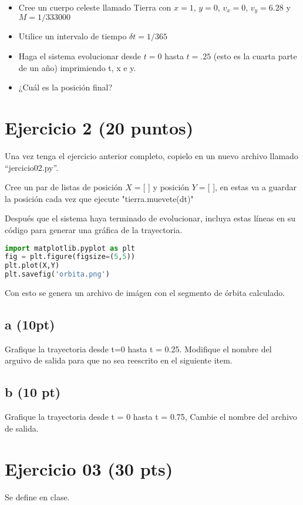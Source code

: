\documentclass{article}
\begin{document}
\begin{itemize}
    \item Cree un cuerpo celeste llamado Tierra con $x=1$, $y=0$, $v_x=0$, $v_y=6.28$ y 
$M = 1 / 333000$
    \item Utilice un intervalo de tiempo $\delta t  = 1 / 365$
    \item Haga el sistema evolucionar desde $t=0$ hasta $t=.25$ (esto es la cuarta 
    parte de un año) imprimiendo t, x e y.
    \item ¿Cuál es la posición final?
\end{itemize}

\section*{Ejercicio 2 (20 puntos)}

Una vez tenga el ejercicio anterior completo, copielo en un nuevo archivo llamado
``jercicio02.py''. 

Cree un par de listas de posición $X=$[ ] y posición $Y=$[ ], en estas 
va a guardar la posición cada vez que ejecute "tierra.muevete(dt)"

Después que el sistema haya terminado de evolucionar, incluya estas líneas en su 
código para generar una gráfica de la trayectoria.

\begin{lstlisting}[language=Python, caption=Python example]
import matplotlib.pyplot as plt
fig = plt.figure(figsize=(5,5))
plt.plot(X,Y)
plt.savefig('orbita.png')
\end{lstlisting}

Con esto se genera un archivo de imágen con el segmento de órbita calculado.

\subsection*{a (10pt)}
Grafique la trayectoria desde t=0 hasta t = 0.25. Modifique el nombre del arguivo de salida para que no sea reescrito en el siguiente item.
\subsection*{b (10 pt)}
Grafique la trayectoria desde t = 0 hasta t = 0.75, Cambie el nombre del archivo de salida.

\section*{Ejercicio 03 (30 pts)}
Se define en clase.
\end{document}
